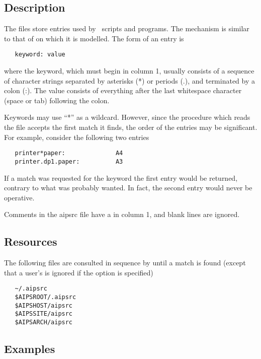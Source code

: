 \subsection*{Description}

The  files store  entries used by \aipspp\ 
scripts and programs.  The mechanism is similar to that of 
on which it is modelled.  The form of an \file{aipsrc} entry is

\begin{verbatim}
   keyword: value
\end{verbatim}

\noindent
where the keyword, which must begin in column 1, usually consists of a
sequence of character strings separated by asterisks (*) or periods (.), and
terminated by a colon (:).  The value consists of everything after the last
whitespace character (space or tab) following the colon.

Keywords may use ``*'' as a wildcard.  However, since the procedure which
reads the \file{aipsrc} file accepts the first match it finds, the order of
the entries may be significant.  For example, consider the following two
\file{aipsrc} entries

\begin{verbatim}
   printer*paper:              A4
   printer.dp1.paper:          A3
\end{verbatim}

\noindent
If a match was requested for the keyword  the first
entry would be returned, contrary to what was probably wanted.  In fact, the
second entry would never be operative.

Comments in the aipsrc file have a \code{\#} in column 1, and blank lines are
ignored.

\subsection*{Resources}

The following  files are consulted in sequence by 
until a match is found (except that a user's \file{~/.aipsrc} is ignored if
the \exe{-i} option is specified)

\begin{verbatim}
   ~/.aipsrc
   $AIPSROOT/.aipsrc
   $AIPSHOST/aipsrc
   $AIPSSITE/aipsrc
   $AIPSARCH/aipsrc
\end{verbatim}

\subsection*{Examples}

